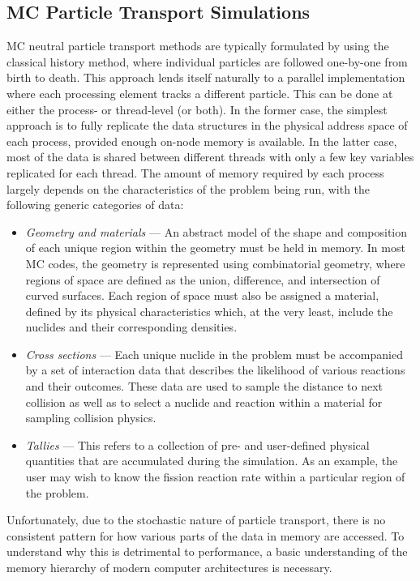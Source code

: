 \documentclass{mc2015}
\begin{document}
\subsection{MC Particle Transport Simulations}

MC neutral particle transport methods are typically formulated by using the
classical history method, where individual particles are followed one-by-one
from birth to death. This approach lends itself naturally to a parallel
implementation where each processing element tracks a different particle. This
can be done at either the process- or thread-level (or both). In the former
case, the simplest approach is to fully replicate the data structures in the
physical address space of each process, provided enough on-node memory is
available. In the latter case, most of the data is shared between different
threads with only a few key variables replicated for each thread. The amount of
memory required by each process largely depends on the characteristics of the
problem being run, with the following generic categories of data:
\begin{itemize}
\item \emph{Geometry and materials} --- An abstract model of the shape and
  composition of each unique region within the geometry must be held in
  memory. In most MC codes, the geometry is represented using combinatorial
  geometry, where regions of space are defined as the union, difference, and
  intersection of curved surfaces. Each region of space must also be assigned a
  material, defined by its physical characteristics which, at the very least,
  include the nuclides and their corresponding densities.
\item \emph{Cross sections} --- Each unique nuclide in the problem must be
  accompanied by a set of interaction data that describes the likelihood of
  various reactions and their outcomes. These data are used to sample the
  distance to next collision as well as to select a nuclide and reaction within
  a material for sampling collision physics.
\item \emph{Tallies} --- This refers to a collection of pre- and user-defined
  physical quantities that are accumulated during the simulation. As an
  example, the user may wish to know the fission reaction rate within a
  particular region of the problem.
\end{itemize}
Unfortunately, due to the stochastic nature of particle transport, there is no
consistent pattern for how various parts of the data in memory are accessed. To
understand why this is detrimental to performance, a basic understanding of the
memory hierarchy of modern computer architectures is necessary.
\end{document}

